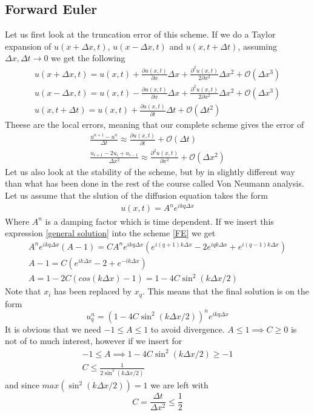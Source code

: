 \documentclass[a4paper,english, 10pt, twoside]{article}
\begin{document}
\subsection{Forward Euler}
Let us first look at the truncation error of this scheme. If we do a Taylor expansion of $u(x+\Delta x,t)$, $u(x-\Delta x,t)$ 
and $u(x,t+\Delta t)$, assuming $\Delta x,\Delta t \to 0$ we get the following
\begin{align*}
 u(x+\Delta x,t) = u(x,t) + \frac{\partial u(x,t)}{\partial x}\Delta x +\frac{\partial^2u(x,t)}{2\partial x^2}\Delta x^2 
 +\mathcal{O}(\Delta x^3)\\
 u(x-\Delta x,t) = u(x,t) - \frac{\partial u(x,t)}{\partial x}\Delta x +\frac{\partial^2u(x,t)}{2\partial x^2}\Delta x^2 
 +\mathcal{O}(\Delta x^3) \\
  u(x,t+\Delta t) = u(x,t) + \frac{\partial u(x,t)}{\partial t}\Delta t +\mathcal{O}(\Delta t^2)
 \end{align*}
Theese are the local errors, meaning that our complete scheme gives the error of 
\begin{align*}
 \frac{u^{n+1}-u^n}{\Delta t} \approx \frac{\partial u(x,t)}{\partial t} +\mathcal{O}(\Delta t)\\
 \frac{u_{i+1}-2u_i +u_{i-1}}{\Delta x^2} \approx \frac{\partial^2 u(x,t)}{\partial x^2} +\mathcal{O}(\Delta x^2)
\end{align*}
Let us also look at the stability of the scheme, but by in slightly different way than what has been done in the rest of the 
course called Von Neumann analysis. Let us assume that the slution of the diffusion equation takes the form
\begin{align}\label{general solution}
 u(x,t) = A^ne^{ikq\Delta x}
\end{align}
Where $A^n$ is a damping factor which is time dependent. If we insert this expression \ref{general solution} into the scheme 
\ref{FE} we get
\begin{align*}
 A^ne^{ikq\Delta x}(A-1) = CA^ne^{ikq\Delta x}(e^{i(q+1)k\Delta x}-2e^{iqk\Delta x} +e^{i(q-1)k \Delta x})\\
 A-1 = C(e^{ik\Delta x}-2+e^{-ik \Delta x})\\
 A = 1 - 2C(cos(k\Delta x)-1) = 1 -4C\sin^2(k\Delta x/2)
\end{align*}
Note that $x_i$ has been replaced by $x_q$. This means that the final solution is on the form
\begin{equation*}
 u^n_q = \left(1 -4C\sin^2(k\Delta x/2)\right)^ne^{ikq\Delta x}
\end{equation*}
It is obvious that we need $-1\leq A\leq 1$ to avoid divergence. $A\leq 1 \implies C\geq 0$ is not of to much interest, however 
if we insert for 
\begin{align*}
 -1 \leq A \implies 1 -4C\sin^2(k\Delta x/2) \geq -1 \\
 C \leq \frac{1}{2\sin^2(k\Delta x/2)}
\end{align*}
and since $max(\sin^2(k\Delta x/2)) = 1$ we are left with
\begin{equation}\label{stability criterion}
 C = \frac{\Delta t}{\Delta x^2} \leq \frac{1}{2}
\end{equation}
\end{document}
